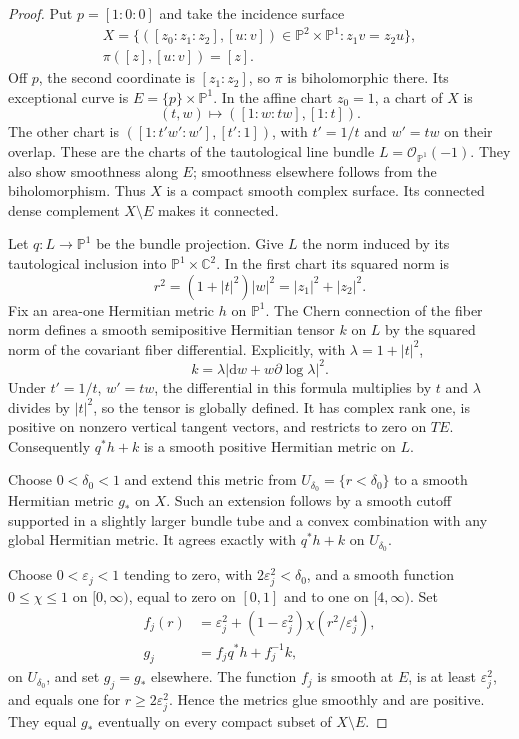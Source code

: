\begin{proof}
Put $p=[1:0:0]$ and take the incidence surface
\[
 \begin{gathered}
 X=\bigl\{([z_0:z_1:z_2],[u:v])\in\mathbb P^2\times\mathbb P^1:
                     z_1v=z_2u\bigr\},\\
 \pi([z],[u:v])=[z].
 \end{gathered}
\]
Off $p$, the second coordinate is $[z_1:z_2]$, so $\pi$ is biholomorphic there. Its exceptional curve is $E=\{p\}\times\mathbb P^1$. In the affine chart $z_0=1$, a chart of $X$ is
\[
 (t,w)\longmapsto([1:w:tw],[1:t]).
\]
The other chart is $([1:t'w':w'],[t':1])$, with $t'=1/t$ and $w'=tw$ on their overlap. These are the charts of the tautological line bundle $L=\mathcal O_{\mathbb P^1}(-1)$. They also show smoothness along $E$; smoothness elsewhere follows from the biholomorphism. Thus $X$ is a compact smooth complex surface. Its connected dense complement $X\setminus E$ makes it connected.

Let $q\colon L\to\mathbb P^1$ be the bundle projection. Give $L$ the norm induced by its tautological inclusion into $\mathbb P^1\times\mathbb C^2$. In the first chart its squared norm is
\[
 r^2=(1+|t|^2)|w|^2=|z_1|^2+|z_2|^2.
\]
Fix an area-one Hermitian metric $h$ on $\mathbb P^1$. The Chern connection of the fiber norm defines a smooth semipositive Hermitian tensor $k$ on $L$ by the squared norm of the covariant fiber differential. Explicitly, with $\lambda=1+|t|^2$,
\[
 k=\lambda\left|\mathrm{d}w+w\partial\log\lambda\right|^2.
\]
Under $t'=1/t$, $w'=tw$, the differential in this formula multiplies by $t$ and $\lambda$ divides by $|t|^2$, so the tensor is globally defined. It has complex rank one, is positive on nonzero vertical tangent vectors, and restricts to zero on $TE$. Consequently $q^*h+k$ is a smooth positive Hermitian metric on $L$.

Choose $0<\delta_0<1$ and extend this metric from $U_{\delta_0}=\{r<\delta_0\}$ to a smooth Hermitian metric $g_*$ on $X$. Such an extension follows by a smooth cutoff supported in a slightly larger bundle tube and a convex combination with any global Hermitian metric. It agrees exactly with $q^*h+k$ on $U_{\delta_0}$.

Choose $0<\varepsilon_j<1$ tending to zero, with $2\varepsilon_j^2<\delta_0$, and a smooth function $0\leq\chi\leq1$ on $[0,\infty)$, equal to zero on $[0,1]$ and to one on $[4,\infty)$. Set
\[
 \begin{aligned}
 f_j(r)&=\varepsilon_j^2+(1-\varepsilon_j^2)
                     \chi(r^2/\varepsilon_j^4),\\
 g_j&=f_jq^*h+f_j^{-1}k,
 \end{aligned}
\]
on $U_{\delta_0}$, and set $g_j=g_*$ elsewhere. The function $f_j$ is smooth at $E$, is at least $\varepsilon_j^2$, and equals one for $r\geq2\varepsilon_j^2$. Hence the metrics glue smoothly and are positive. They equal $g_*$ eventually on every compact subset of $X\setminus E$.


\end{proof}
